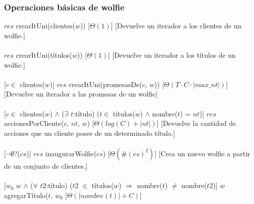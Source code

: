   \subsubsection{Operaciones b\'asicas de wolfie}
  {$res$ \igobs crearItUni(clientes($w$))}
  [$\Theta(1)$]
  [Devuelve un iterador a los clientes de un wolfie.]\\\\
  {$res$ \igobs crearItUni(t\'itulos($w$))}%
  [$\Theta(1)$]
  [Devuelve un iterador a los t\'itulos de un wolfie.]\\\\
  [$c \in$ clientes($w$)]
  {$res$ \igobs crearItUni(promesasDe($c$, $w$))}%
  [$\Theta(T \cdotp C \cdotp |max\_nt|)$]
  [Devuelve un iterador a las promesas de un wolfie]\\\\
  [$c \in$ clientes($w$) $\land$ ($\exists$ $t$:t\'itulo) ($t \in$ t\'itulos($w$) $\land$ nombre($t$) = $nt$)]
  {$res$ \igobs accionesPorCliente($c$, $nt$, $w$)}%
  [$\Theta(log(C)+|nt|)$]
  [Devuelve la cantidad de acciones que un cliente posee de un determinado t\'itulo.]\\\\
  [$\neg\emptyset$?($cs$)]
  {$res$ \igobs inaugurarWolfie($cs$)}
  [$\Theta(\#(cs)^2)$]
  [Crea un nuevo wolfie a partir de un conjunto de clientes.]\\\\  %
  [$w_{0}$ \igobs $w$ $\land$ ($\forall$ $t2$:t\'itulo) ($t2$ $\in$ t\'itulos($w$) $\Rightarrow$ nombre($t$) $\neq$ nombre($t2$)]
  {$w$ \igobs agregarT\'itulo($t$, $w_{0}$}%
  [$\Theta(|nombre(t)|+C)$]\\\\
